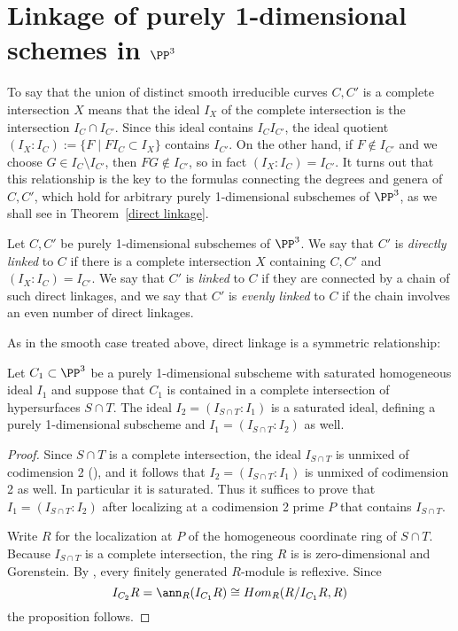 \section{Linkage of purely 1-dimensional schemes in $\PP^3$}
To say that the union of distinct smooth irreducible curves $C, C'$  is a complete intersection $X$ means that 
the ideal $I_X$ of the complete intersection is the intersection $I_C\cap I_{C'}$. Since this ideal contains $I_CI_{C'}$, the ideal quotient
$(I_X:I_C) := \{F \mid FI_C\subset I_X\}$
contains $I_{C'}$. On the other hand, if $F \notin I_{C'}$ and we choose $G\in I_C\setminus I_{C'}$, then $FG\notin I_{C'}$, so in fact
$(I_X:I_C) = I_{C'}$. It turns out that this relationship is the key to the formulas connecting the degrees and genera of $C,C'$, which hold 
for arbitrary purely 1-dimensional subschemes of $\PP^3$, as we shall see in Theorem~\ref{direct linkage}. 

\begin{definition}
Let $C,C'$ be purely 1-dimensional subschemes of $\PP^3$. We say that $C'$ is \emph{directly linked} to $C$ if there is a complete
intersection $X$ containing $C,C'$ and $(I_X:I_C) = I_{C'}$. We say that $C'$ is \emph{linked} to $C$ if they are connected by a chain of such
direct linkages, and we say that $C'$ is \emph{evenly linked} to $C$ if the chain involves an even number of direct linkages.
\end{definition}

As in the smooth case treated above, direct linkage is a symmetric relationship:
\begin{proposition}
Let $C_1\subset \PP^3$ be a purely 1-dimensional subscheme with saturated homogeneous ideal $I_1$ and suppose that $C_1$ is contained in a complete intersection of
hypersurfaces $S\cap T$. The ideal $I_2 = (I_{S\cap T}:I_1)$ is a saturated ideal, defining a purely 1-dimensional subscheme and 
$I_1 = (I_{S\cap T}: I_2)$ as well.
\end{proposition}
 
\begin{proof}
Since $S\cap T$ is a complete intersection, the ideal $I_{S\cap T}$ is unmixed of codimension 2
(\cite[***]{Eisenbud1995}), and it follows
that $I_2 = (I_{S\cap T}:I_1)$ is unmixed of codimension 2 as well. In particular it is saturated.
Thus it suffices to prove that $I_1 = (I_{S\cap T}: I_2)$ after localizing at a codimension 2 prime $P$
that contains $I_{S\cap T}$. 

Write $R$ for the localization at $P$ of the homogeneous coordinate ring of $S\cap T$. 
Because $I_{S\cap T}$ is a complete intersection, the ring $R$ is
 is zero-dimensional and Gorenstein.
By \cite[***]{Eisenbud1995}, every finitely generated $R$-module is reflexive. Since 
$$
I_{C_2}R= \ann_{R}(I_{C_1}R) \cong Hom_R(R/I_{C_1}R, R)
$$
the proposition follows.
\end{proof}

